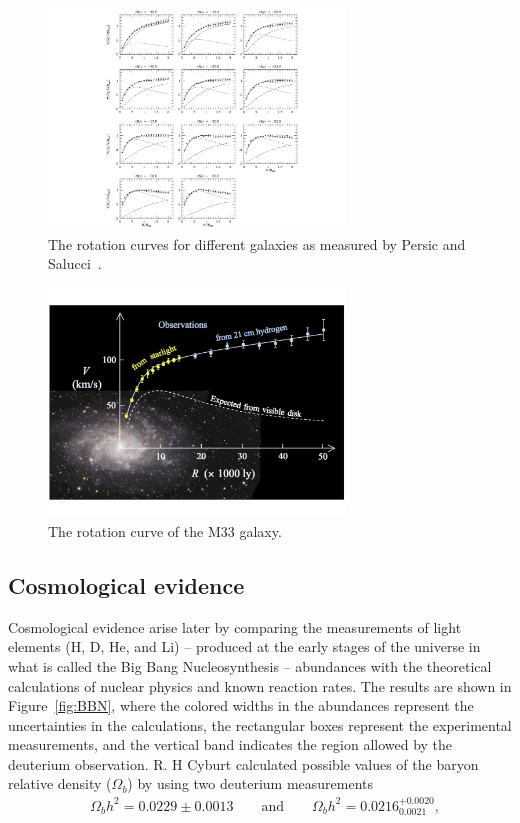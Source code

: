 \begin{figure}
 \centering
\includegraphics[width=0.7\textwidth]{IntroFigures/RotationCurve1.pdf}
 \caption{The rotation curves for different galaxies as measured by Persic and Salucci~\cite{PandS}.\label{fig:rotationcurve}}
\end{figure}
\begin{figure}
 \centering
\includegraphics[width=0.7\textwidth]{IntroFigures/M33_rotation_curve_HI.pdf}
\caption{The rotation curve of the M33 galaxy.\label{fig:M33}}
\end{figure}

\subsection{Cosmological evidence}
Cosmological evidence arise later by comparing the measurements of light
elements (H, D, He, and Li) -- produced at
the early stages of the universe in what is called the Big Bang
Nucleosynthesis -- abundances with
the theoretical calculations of nuclear physics and known reaction
rates. The results are shown in Figure~\ref{fig:BBN}, where the colored
widths in the abundances represent the uncertainties in the calculations, the
rectangular boxes represent the experimental measurements, and the
vertical band indicates the region allowed by the deuterium
observation. R. H Cyburt calculated possible values of the baryon
relative density ($\Omega_{b}$) by using two deuterium measurements~\cite{BBN}
\begin{equation}
\label{eq:BBN}
\begin{aligned}
       &\Omega_{b}h^{2} = 0.0229\pm0.0013 
        \qquad \text{and}  \qquad  \Omega_{b}h^{2} = 0.0216^{+0.0020}_{0.0021},
       \end{aligned}
\end{equation}

